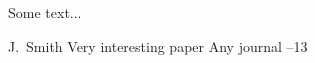 \documentclass{article}
\begin{document}

\author{Author's Name}

Some text...

\begin{thebibliography}{99}


\by J.~Smith
\paper Very interesting paper
\jour Any journal
--13


\end{thebibliography}
\end{document}
